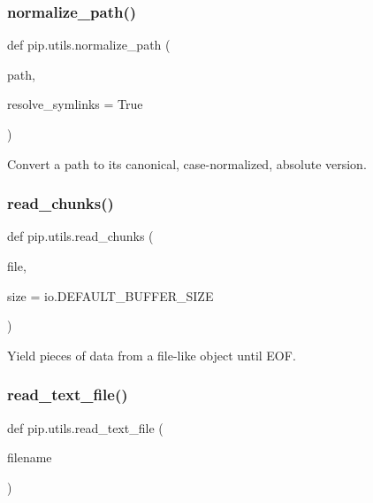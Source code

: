 \subsubsection{\texorpdfstring{normalize\+\_\+path()}{normalize\_path()}}
{\footnotesize\ttfamily def pip.\+utils.\+normalize\+\_\+path (\begin{DoxyParamCaption}\item[{}]{path,  }\item[{}]{resolve\+\_\+symlinks = {\ttfamily True} }\end{DoxyParamCaption})}

\begin{DoxyVerb}Convert a path to its canonical, case-normalized, absolute version.\end{DoxyVerb}
 \mbox{\label{namespacepip_1_1utils_a79d82feb4a0f6da27c00f79b1a36fcc2}} 
\subsubsection{\texorpdfstring{read\+\_\+chunks()}{read\_chunks()}}
{\footnotesize\ttfamily def pip.\+utils.\+read\+\_\+chunks (\begin{DoxyParamCaption}\item[{}]{file,  }\item[{}]{size = {\ttfamily io.DEFAULT\+\_\+BUFFER\+\_\+SIZE} }\end{DoxyParamCaption})}

\begin{DoxyVerb}Yield pieces of data from a file-like object until EOF.\end{DoxyVerb}
 \mbox{\label{namespacepip_1_1utils_a0c2a582f19f830d5002708d70ebb03c7}} 
\subsubsection{\texorpdfstring{read\+\_\+text\+\_\+file()}{read\_text\_file()}}
{\footnotesize\ttfamily def pip.\+utils.\+read\+\_\+text\+\_\+file (\begin{DoxyParamCaption}\item[{}]{filename }\end{DoxyParamCaption})}

